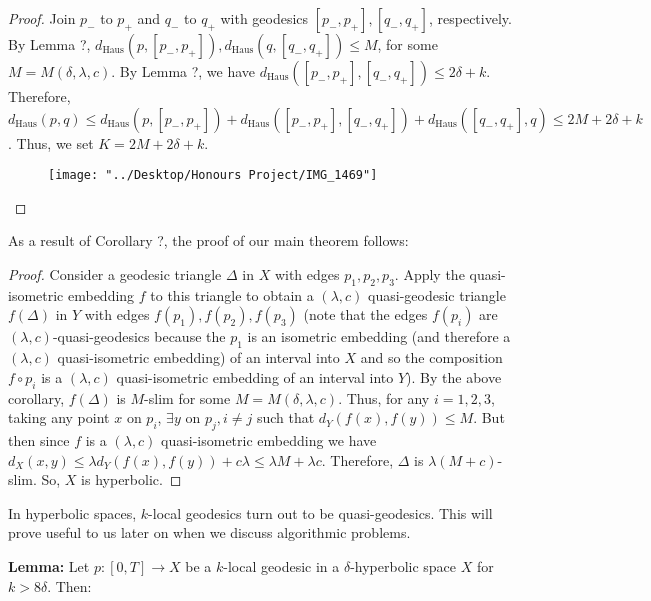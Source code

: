 \documentclass[12pt]{article}
\newcommand{\vs}{\vskip10pt}
\begin{document}
	\begin{proof}
		
		Join $p_-$ to $p_+$ and $q_-$ to $q_+$ with geodesics $[p_-, p_+], [q_-, q_+]$, respectively. By Lemma ?, $d_{\text{Haus}}(p, [p_-, p_+]), d_{\text{Haus}}(q, [q_-, q_+]) \leq M$, for some $M = M(\delta, \lambda, c)$. By Lemma ?, we have $d_{\text{Haus}}([p_-, p_+], [q_-, q_+]) \leq 2\delta + k$. Therefore, $d_{\text{Haus}}(p,q) \leq d_{\text{Haus}}(p, [p_-, p_+]) + d_{\text{Haus}}([p_-, p_+], [q_-, q_+]) + d_{\text{Haus}}([q_-, q_+], q) \leq 2M + 2\delta + k$. Thus, we set $K = 2M + 2\delta + k$.
		
		\begin{figure} [h]
			\centering
			\texttt{[image: "../Desktop/Honours Project/IMG\_1469"]}
			\caption{}
			\label{fig:img1469}
		\end{figure}
		
	\end{proof}

	As a result of Corollary ?, the proof of our main theorem follows: 
	
	\begin{proof}
		
		Consider a geodesic triangle $\Delta$ in $X$ with edges $p_1, p_2, p_3$. Apply the quasi-isometric embedding $f$ to this triangle to obtain a $(\lambda, c)$ quasi-geodesic triangle $f(\Delta)$ in $Y$ with edges $f(p_1), f(p_2), f(p_3)$ (note that the edges $f(p_i)$ are $(\lambda, c)$-quasi-geodesics because the $p_1$ is an isometric embedding (and therefore a $(\lambda, c)$ quasi-isometric embedding) of an interval into $X$ and so the composition $f \circ p_i$ is a $(\lambda, c)$ quasi-isometric embedding of an interval into $Y$). By the above corollary, $f(\Delta)$ is $M$-slim for some $M = M(\delta, \lambda, c)$. Thus, for any $i = 1,2,3$, taking any point $x$ on $p_i$, $\exists y$ on $p_j, i \neq j$ such that $d_Y(f(x), f(y)) \leq M$. But then since $f$ is a $(\lambda, c)$ quasi-isometric embedding we have $d_X(x,y) \leq \lambda d_Y(f(x), f(y)) + c \lambda \leq \lambda M + \lambda c$. Therefore, $\Delta$ is $\lambda (M + c)$-slim. So, $X$ is hyperbolic. 
		
	\end{proof}

	In hyperbolic spaces, $k$-local geodesics turn out to be quasi-geodesics. This will prove useful to us later on when we discuss algorithmic problems. 
	
	\vs 
	
	\textbf{Lemma: } Let $p: [0, T] \rightarrow X$ be a $k$-local geodesic in a $\delta$-hyperbolic space $X$ for $k > 8\delta$. Then: 
	
\end{document}
